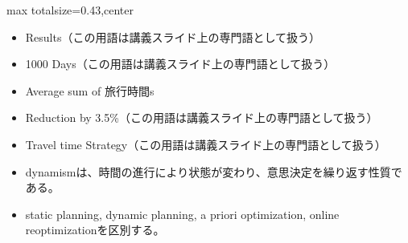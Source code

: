 \clearpage
{}
\begin{minipage}[t]{0.405\textwidth}
\begin{adjustbox}{max totalsize={\textwidth}{0.43\textheight},center}
\begin{minipage}{\textwidth}\scriptsize
{}\begin{itemize}
\item Results（この用語は講義スライド上の専門語として扱う）
\item 1000 Days（この用語は講義スライド上の専門語として扱う）
\item Average sum of 旅行時間s
\item Reduction by 3.5\%（この用語は講義スライド上の専門語として扱う）
\item Travel time Strategy（この用語は講義スライド上の専門語として扱う）
\end{itemize}\begin{itemize}
\item dynamismは、時間の進行により状態が変わり、意思決定を繰り返す性質である。
\item static planning, dynamic planning, a priori optimization, online reoptimizationを区別する。
\end{itemize}
\end{minipage}
\end{adjustbox}
\end{minipage}\hfill
